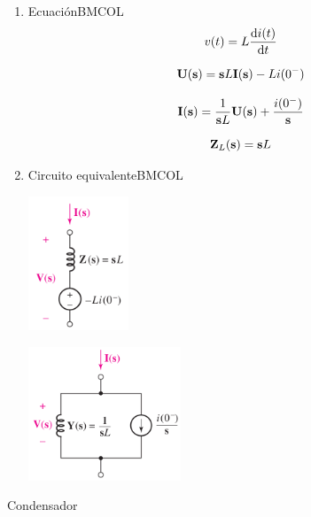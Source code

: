 \begin{enumerate}
\item Ecuación\hfill{}\textsc{BMCOL}
\label{sec:org0d0e0c8}
\[
  v(t) = L \diff{i(t)}{t}
\]

\[
  \mathbf{U}(\mathbf{s}) = \mathbf{s} L \mathbf{I}(\mathbf{s}) - L i(0^-)
\]

\[
  \mathbf{I}(\mathbf{s}) = \frac{1}{\mathbf{s} L} \mathbf{U}(\mathbf{s}) + \frac{i(0^-)}{\mathbf{s}}
\]

\[
  \mathbf{Z}_L(\mathbf{s}) = \mathbf{s} L
\]

\item Circuito equivalente\hfill{}\textsc{BMCOL}
\label{sec:orga2ecd73}
\begin{center}
\includegraphics[height=4cm]{../figs/Bobina_Laplace_Impedancia.pdf}
\end{center}

\begin{center}
\includegraphics[height=4cm]{../figs/Bobina_Laplace_Admitancia.pdf}
\end{center}
\end{enumerate}


{Condensador}

